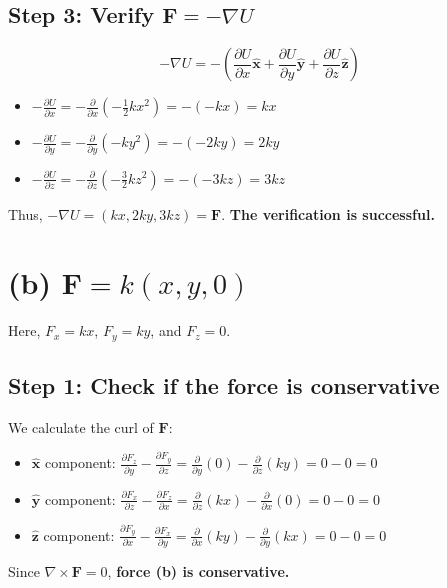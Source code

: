 \documentclass[11pt, a4paper]{article} %
\begin{document}
\subsection*{Step 3: Verify $\mathbf{F} = -\nabla U$}
$$-\nabla U = -\left(\frac{\partial U}{\partial x}\hat{\mathbf{x}} + \frac{\partial U}{\partial y}\hat{\mathbf{y}} + \frac{\partial U}{\partial z}\hat{\mathbf{z}}\right)$$
\begin{itemize}
    \item $-\frac{\partial U}{\partial x} = -\frac{\partial}{\partial x}\left(-\frac{1}{2}kx^2\right) = -(-kx) = kx$
    \item $-\frac{\partial U}{\partial y} = -\frac{\partial}{\partial y}\left(-ky^2\right) = -(-2ky) = 2ky$
    \item $-\frac{\partial U}{\partial z} = -\frac{\partial}{\partial z}\left(-\frac{3}{2}kz^2\right) = -(-3kz) = 3kz$
\end{itemize}
Thus, $-\nabla U = (kx, 2ky, 3kz) = \mathbf{F}$. \textbf{The verification is successful.}

\hrulefill

\section*{(b) $\mathbf{F} = k(x, y, 0)$}

Here, $F_x = kx$, $F_y = ky$, and $F_z = 0$.

\subsection*{Step 1: Check if the force is conservative}
We calculate the curl of $\mathbf{F}$:
\begin{itemize}
    \item $\hat{\mathbf{x}}$ component: $\frac{\partial F_z}{\partial y} - \frac{\partial F_y}{\partial z} = \frac{\partial}{\partial y}(0) - \frac{\partial}{\partial z}(ky) = 0 - 0 = 0$
    \item $\hat{\mathbf{y}}$ component: $\frac{\partial F_x}{\partial z} - \frac{\partial F_z}{\partial x} = \frac{\partial}{\partial z}(kx) - \frac{\partial}{\partial x}(0) = 0 - 0 = 0$
    \item $\hat{\mathbf{z}}$ component: $\frac{\partial F_y}{\partial x} - \frac{\partial F_x}{\partial y} = \frac{\partial}{\partial x}(ky) - \frac{\partial}{\partial y}(kx) = 0 - 0 = 0$
\end{itemize}
Since $\nabla \times \mathbf{F} = 0$, \textbf{force (b) is conservative.}
\end{document}
